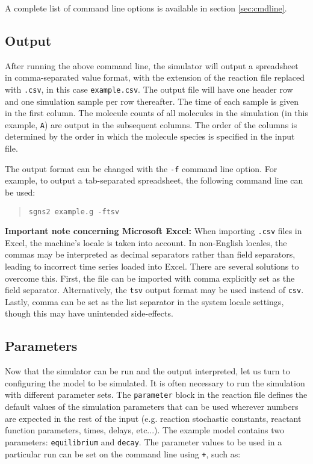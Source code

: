 \documentclass[10pt]{article}
\newcommand{\code}[1]{{\tt {#1}}}
\newcommand{\progexe}{sgns2}
\begin{document}
A complete list of command line options is available in section \ref{sec:cmdline}.

\subsection{Output}

After running the above command line, the simulator will output a spreadsheet in comma-separated value format, with the extension of the reaction file replaced with \code{.csv}, in this case \code{example.csv}. The output file will have one header row and one simulation sample per row thereafter. The time of each sample is given in the first column. The molecule counts of all molecules in the simulation (in this example, \code{A}) are output in the subsequent columns. The order of the columns is determined by the order in which the molecule species is specified in the input file.

The output format can be changed with the \code{-f} command line option. For example, to output a tab-separated spreadsheet, the following command line can be used:

\begin{quote}
\code{\progexe\ example.g -ftsv}
\end{quote}

\textbf{Important note concerning Microsoft Excel:} When importing \code{.csv} files in Excel, the machine's locale is taken into account. In non-English locales, the commas may be interpreted as decimal separators rather than field separators, leading to incorrect time series loaded into Excel. There are several solutions to overcome this. First, the file can be imported with comma explicitly set as the field separator. Alternatively, the \code{tsv} output format may be used instead of \code{csv}. Lastly, comma can be set as the list separator in the system locale settings, though this may have unintended side-effects.

\subsection{Parameters}

Now that the simulator can be run and the output interpreted, let us turn to configuring the model to be simulated. It is often necessary to run the simulation with different parameter sets. The \code{parameter} block in the reaction file defines the default values of the simulation parameters that can be used wherever numbers are expected in the rest of the input (e.g. reaction stochastic constants, reactant function parameters, times, delays, etc...). The example model contains two parameters: \code{equilibrium} and \code{decay}. The parameter values to be used in a particular run can be set on the command line using \code{+}, such as:
\end{document}
